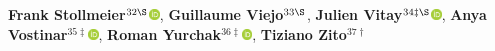 \textbf{Frank Stollmeier}$^{32\S}$\href{http://orcid.org/0000-0003-4858-0895}{\includegraphics[width=8pt]{orcid}},
\textbf{Guillaume Viejo}$^{33\S}$,
\textbf{Julien Vitay}$^{34\ddagger\S}$\href{http://orcid.org/0000-0001-5229-2349}{\includegraphics[width=8pt]{orcid}},
\textbf{Anya Vostinar}$^{35\ddagger}$\href{http://orcid.org/0000-0001-7216-5283}{\includegraphics[width=8pt]{orcid}},
\textbf{Roman Yurchak}$^{36\ddagger}$\href{http://orcid.org/0000-0002-2565-4444}{\includegraphics[width=8pt]{orcid}},
\textbf{Tiziano Zito}$^{37\dagger}$\\
